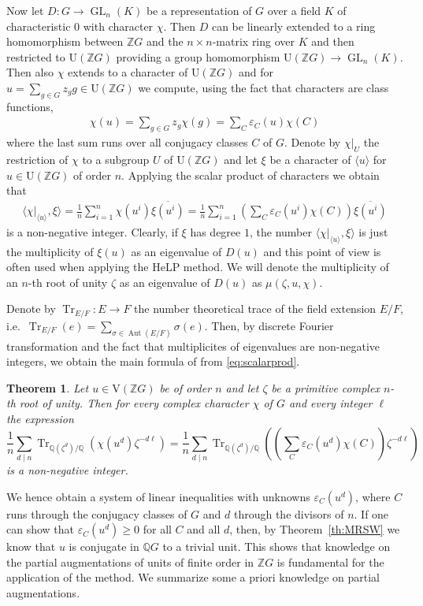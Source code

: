 \documentclass[10pt,a4paper,reqno]{amsart}
\newtheorem{theorem}{Theorem}[section]
\theoremstyle{definition}
\theoremstyle{remark}
\newcommand{\Aut}{\operatorname{Aut}}
\newcommand{\Tr}{\operatorname{Tr}}
\newcommand{\U}{\mathrm{U}}
\newcommand{\V}{\mathrm{V}}
\newcommand{\ZZ}{\mathbb{Z}}
\newcommand{\QQ}{\mathbb{Q}}
\begin{document}
Now let $D: G \rightarrow \operatorname{GL}_n(K)$ be a representation of $G$ over a field $K$ of characteristic $0$ with character $\chi$. Then $D$ can be linearly extended to a ring homomorphism between $\ZZ G$ and the $n\times n$-matrix ring over $K$ and then restricted to $\U(\ZZ G)$ providing a group homomorphism $\U(\ZZ G) \rightarrow \operatorname{GL}_n(K)$. Then also $\chi$ extends to a character of $\U(\ZZ G)$ and for $u = \sum_{g \in G} z_g g \in \U(\ZZ G)$ we compute, using the fact that characters are class functions,
\begin{align}\label{eq:character}
\chi(u) = \sum_{g\in G} z_g\chi(g) = \sum_C \varepsilon_C(u) \chi(C) 
\end{align}
where the last sum runs over all conjugacy classes $C$ of $G$. Denote by $\chi|_U$ the restriction of $\chi$ to a subgroup $U$ of $\U(\ZZ G)$ and let $\xi$ be a character of $\langle u \rangle$ for $u \in \U(\ZZ G)$ of order $n$. Applying the scalar product of characters we obtain that
\begin{align}\label{eq:scalarprod}
\langle \chi|_{\langle u \rangle}, \xi \rangle =  \frac{1}{n} \sum_{i=1}^n \chi(u^i)\overline{\xi(u^i)} = \frac{1}{n} \sum_{i=1}^n \left(\sum_C \varepsilon_C(u^i)\chi(C) \right) \overline{\xi(u^i)} 
\end{align}
is a non-negative integer. Clearly, if $\xi$ has degree $1$, the number $\langle \chi|_{\langle u \rangle}, \xi \rangle$ is just the multiplicity of $\xi(u)$ as an eigenvalue of $D(u)$ and this point of view is often used when applying the HeLP method. We will denote the multiplicity of an $n$-th root of unity $\zeta$ as an eigenvalue of $D(u)$ as $\mu(\zeta, u, \chi)$.

Denote by $ \Tr_{E/F}: E \rightarrow F$ the number theoretical trace of the field extension $E/F$, i.e.\ $\Tr_{E/F}(e) = \sum_{\sigma \in \Aut(E/F)} \sigma(e)$. Then, by discrete Fourier transformation and the fact that multiplicites of eigenvalues are non-negative integers, we obtain the main formula of \cite{LP89} from \eqref{eq:scalarprod}.

\begin{theorem}\label{th:LP} \cite[Theorem 1]{LP89}
Let $u \in \V(\ZZ G)$ be of order $n$ and let $\zeta$ be a primitive complex $n$-th root of unity. Then for every complex character $\chi$ of $G$ and every integer $\ell$ the expression
$$\frac{1}{n} \sum_{d \mid n} \Tr_{\QQ(\zeta^d)/\QQ}\left(\chi(u^d)\zeta^{-d\ell} \right) = \frac{1}{n} \sum_{d \mid n} \Tr_{\QQ(\zeta^d)/\QQ}\left(\left(\sum_C \varepsilon_C(u^d) \chi(C) \right) \zeta^{-d\ell} \right) $$
is a non-negative integer.
\end{theorem} 
We hence obtain a system of linear inequalities with unknowns $\varepsilon_C(u^d)$, where $C$ runs through the conjugacy classes of $G$ and $d$ through the divisors of $n$. If one can show that $\varepsilon_C(u^d) \geqslant 0$ for all $C$ and all $d$, then, by Theorem~\ref{th:MRSW} we know that $u$ is conjugate in $\QQ G$ to a trivial unit. This shows that knowledge on the partial augmentations of units of finite order in $\ZZ G$ is fundamental for the application of the method. We summarize some a priori knowledge on partial augmentations.
\end{document}
